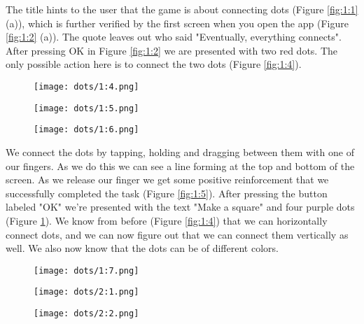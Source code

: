 The title hints to the user that the game is about connecting dots (Figure \ref{fig:1:1} (a)), which is further verified by the first screen when you open the app (Figure \ref{fig:1:2} (a)). The quote leaves out who said "Eventually, everything connects". After pressing OK in Figure \ref{fig:1:2} we are presented with two red dots. The only possible action here is to connect the two dots (Figure \ref{fig:1:4}).

\begin{figure}
\centering
\captionsetup{format=multiline,font=footnotesize}
\begin{minipage}{.33333\textwidth}
  \centering
  \texttt{[image: dots/1:4.png]}
  \label{fig:1:4}
\end{minipage}%
\begin{minipage}{.33333\textwidth}
  \centering
  \texttt{[image: dots/1:5.png]}
  \label{fig:1:5}
\end{minipage}%
\begin{minipage}{.33333\textwidth}
  \centering
  \texttt{[image: dots/1:6.png]}
  \label{fig:1:6}
\end{minipage}
\end{figure}

We connect the dots by tapping, holding and dragging between them with one of our fingers. As we do this we can see a line forming at the top and bottom of the screen. As we release our finger we get some positive reinforcement that we successfully completed the task (Figure \ref{fig:1:5}). After pressing the button labeled "OK" we're presented with the text "Make a square" and four purple dots (Figure \ref{fig:1:6}). We know from before (Figure \ref{fig:1:4}) that we can horizontally connect dots, and we can now figure out that we can connect them vertically as well. We also now know that the dots can be of different colors.

\begin{figure}
\centering
\captionsetup{format=multiline,font=footnotesize}
\captionsetup{format=multiline,font=footnotesize}
\begin{minipage}{.33333\textwidth}
  \centering
  \texttt{[image: dots/1:7.png]}
  \label{fig:1:7}
\end{minipage}%
\begin{minipage}{.33333\textwidth}
  \centering
  \texttt{[image: dots/2:1.png]}
  \label{fig:2:1}
\end{minipage}%
\begin{minipage}{.33333\textwidth}
  \centering
  \texttt{[image: dots/2:2.png]}
  \label{fig:2:2}
\end{minipage}
\end{figure}

